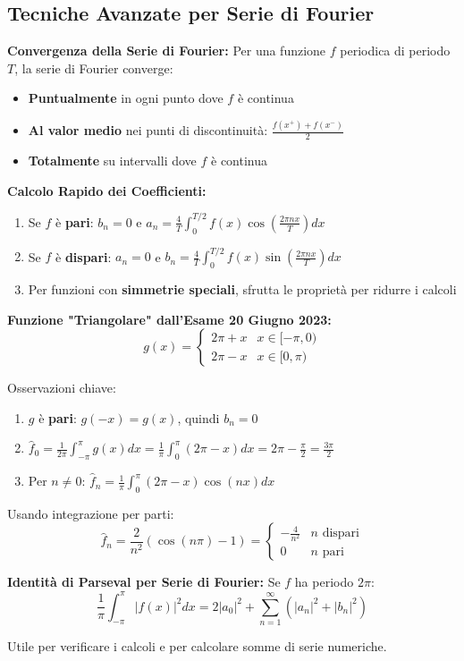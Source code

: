 \subsection{Tecniche Avanzate per Serie di Fourier}

\begin{info}
\textbf{Convergenza della Serie di Fourier:}
Per una funzione \(f\) periodica di periodo \(T\), la serie di Fourier converge:
\begin{itemize}
    \item \textbf{Puntualmente} in ogni punto dove \(f\) è continua
    \item \textbf{Al valor medio} nei punti di discontinuità: \(\frac{f(x^+) + f(x^-)}{2}\)
    \item \textbf{Totalmente} su intervalli dove \(f\) è continua
\end{itemize}
\end{info}

\begin{strategia}
\textbf{Calcolo Rapido dei Coefficienti:}
\begin{enumerate}
    \item Se \(f\) è \textbf{pari}: \(b_n = 0\) e \(a_n = \frac{4}{T}\int_0^{T/2} f(x)\cos\left(\frac{2\pi nx}{T}\right)dx\)
    \item Se \(f\) è \textbf{dispari}: \(a_n = 0\) e \(b_n = \frac{4}{T}\int_0^{T/2} f(x)\sin\left(\frac{2\pi nx}{T}\right)dx\)
    \item Per funzioni con \textbf{simmetrie speciali}, sfrutta le proprietà per ridurre i calcoli
\end{enumerate}
\end{strategia}

\begin{esempio}
\textbf{Funzione "Triangolare" dall'Esame 20 Giugno 2023:}
\[ g(x) = \begin{cases} 2\pi+x & x \in [-\pi,0) \\ 2\pi-x & x \in [0,\pi) \end{cases} \]

Osservazioni chiave:
\begin{enumerate}
    \item \(g\) è \textbf{pari}: \(g(-x) = g(x)\), quindi \(b_n = 0\)
    \item \(\hat{f}_0 = \frac{1}{2\pi}\int_{-\pi}^{\pi} g(x)dx = \frac{1}{\pi}\int_0^{\pi} (2\pi-x)dx = 2\pi - \frac{\pi}{2} = \frac{3\pi}{2}\)
    \item Per \(n \neq 0\): \(\hat{f}_n = \frac{1}{\pi}\int_0^{\pi} (2\pi-x)\cos(nx)dx\)
\end{enumerate}

Usando integrazione per parti:
\[ \hat{f}_n = \frac{2}{n^2}(\cos(n\pi) - 1) = \begin{cases} 
-\frac{4}{n^2} & n \text{ dispari} \\
0 & n \text{ pari}
\end{cases} \]
\end{esempio}

\begin{info}
\textbf{Identità di Parseval per Serie di Fourier:}
Se \(f\) ha periodo \(2\pi\):
\[ \frac{1}{\pi}\int_{-\pi}^{\pi} |f(x)|^2 dx = 2|a_0|^2 + \sum_{n=1}^{\infty}(|a_n|^2 + |b_n|^2) \]

Utile per verificare i calcoli e per calcolare somme di serie numeriche.
\end{info}

